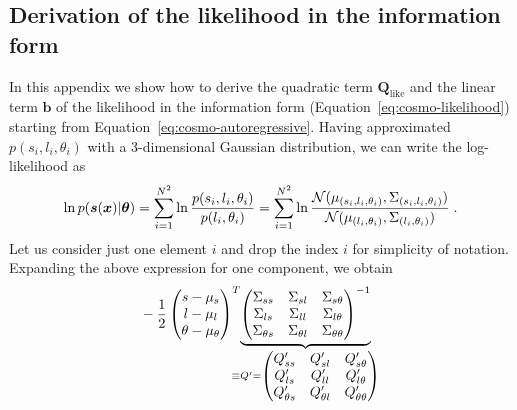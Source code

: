 
\begin{subappendices}

\section{Derivation of the likelihood in the information form} \label{apx:info}

In this appendix we show how to derive the quadratic term $\bm Q_\text{like}$ and the linear term $\bm b$ of the likelihood in the information form (Equation~\ref{eq:cosmo-likelihood}) starting from Equation~\ref{eq:cosmo-autoregressive}. Having approximated $p(s_i, l_i, \theta_i)$ with a 3-dimensional Gaussian distribution, we can write the log-likelihood as
%
\begin{equation}
    \ln p(\bm s(\bm{x})| \bm{\theta}) = \sum_{i=1}^{N^2} \ln \frac{p(s_i, l_i, \theta_i)}{p(l_i, \theta_i)} = \sum_{i=1}^{N^2} \ln \frac{\mathcal{N}(\mu_{(s_i, l_i, \theta_i)}, \Sigma_{(s_i, l_i, \theta_i)})}{\mathcal{N}(\mu_{(l_i, \theta_i)}, \Sigma_{(l_i, \theta_i)})} \;.
\end{equation}
%
Let us consider just one element $i$ and drop the index $i$ for simplicity of notation. Expanding the above expression for one component, we obtain
%
\begin{equation}\label{eq:cosmo-matrix}
\begin{split}
    & -\frac12
    \begin{pmatrix}
    s-\mu_s \\
    l-\mu_l \\ 
    \theta-\mu_\theta \\
    \end{pmatrix}^T\hspace{-3mm}
    \underbrace{
    \begin{pmatrix}
    \Sigma_{ss} & \Sigma_{sl} & \Sigma_{s\theta} \\
    \Sigma_{ls} & \Sigma_{ll} & \Sigma_{l\theta} \\
    \Sigma_{\theta s} & \Sigma_{\theta l} & \Sigma_{\theta \theta}
    \end{pmatrix}^{-1}}_{
    \equiv Q' = 
    \begin{pmatrix}
    Q'_{ss} & Q'_{sl} & Q'_{s\theta} \\
    Q'_{ls} & Q'_{ll} & Q'_{l\theta} \\
    Q'_{\theta s} & Q'_{\theta l} & Q'_{\theta \theta}
    \end{pmatrix}
    }\hspace{-3mm}

\end{split}
\end{equation}
\end{subappendices}
